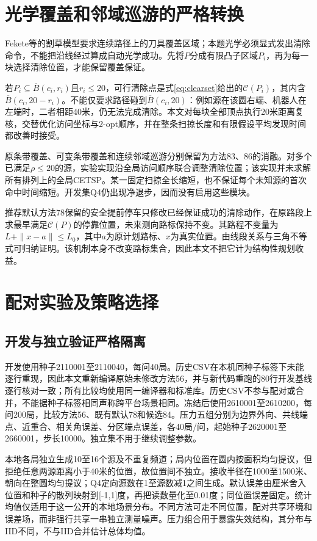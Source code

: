 \documentclass[UTF8,a4paper,zihao=-4,fontset=fandol]{ctexart}
\begin{document}
\section{光学覆盖和邻域巡游的严格转换}
Fekete等\cite{lawn}的割草模型要求连续路径上的刀具覆盖区域；本题光学必须显式发出清除命令，不能把沿线经过算成自动光学成功。先将$P$分成有限凸子区域$P_i$，再为每一块选择清除位置，才能保留覆盖保证。

若$P_i\subseteq \overline B(c_i,r_i)$且$r_i\le20$，可行清除点是式\eqref{eq:clearset}给出的$\mathcal C(P_i)$，其内含$\overline B(c_i,20-r_i)$。不能仅要求路径碰到$\overline B(c_i,20)$：例如源在该圆右端、机器人在左端时，二者相距40米，仍无法完成清除。本文对每块全部顶点执行20米距离复核，交替优化访问坐标与2-opt顺序，并在整条扫掠长度和有限假设平均发现时间都改善时接受。

原条带覆盖、可变条带覆盖和连续邻域巡游分别保留为方法83、86的消融。对多个已满足$\rho\le20$的源，实验实现沿全局访问顺序联合调整清除位置；该实现并未求解所有排列上的全局CETSP。某一固定扫掠全长缩短，也不保证每个未知源的首次命中时间缩短。开发集Q4仍出现净退步，因而没有启用这些模块。

推荐默认方法78保留的安全提前停车只修改已经保证成功的清除动作，在原路段上求最早满足$\mathcal C(P)$的停靠位置，未来测向路标保持不变。其路程不变量为$L+\|x-a\|\le L_0$，其中$a$为原计划路标、$x$为真实位置。由线段关系与三角不等式可归纳证明。该机制本身不改变路标集合，因此本文不把它计为结构性规划收益。

\section{配对实验及策略选择}
\subsection{开发与独立验证严格隔离}
开发使用种子2110001至2110040，每问40局。历史CSV在本机同种子标签下未能逐行重现，因此本文重新编译原始未修改方法56，并与新代码重跑的80行开发基线逐行核对一致；所有比较均使用同一编译器和标准库。历史CSV不参与配对或合并，不能据种子标签相同声称跨平台场景相同。冻结后使用2610001至2610200，每问200局，比较方法56、既有默认78和候选84。压力五组分别为边界外向、共线端点、近重合、相关角误差、分区端点误差，各40局/问，起始种子2620001至2660001，步长10000。独立集不用于继续调整参数。

本地各局独立生成10至16个源及不重复频道；局内位置在圆内按面积均匀提议，但拒绝任意两源距离小于40米的位置，故位置间不独立。接收半径在1000至1500米、朝向在整圆均匀提议；Q4定向源数在1至源数减1之间生成。默认误差由厘米舍入位置和种子的散列映射到[-1,1]度，再把读数量化至0.01度；同位置误差固定。统计均值仅适用于这一公开的本地场景分布。不同方法可走不同位置，配对共享环境和误差场，而非强行共享一串独立测量噪声。压力组合用于暴露失效结构，其分布与IID不同，不与IID合并估计总体均值。
\end{document}
